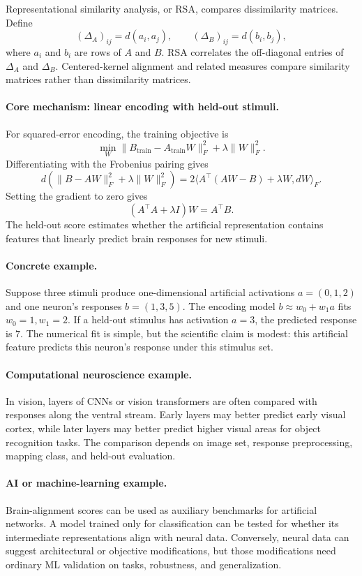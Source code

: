 Representational similarity analysis, or RSA, compares dissimilarity matrices. Define
\[
(\Delta_A)_{ij}=d(a_i,a_j),\qquad
(\Delta_B)_{ij}=d(b_i,b_j),
\]
where \(a_i\) and \(b_i\) are rows of \(A\) and \(B\). RSA correlates the off-diagonal entries of \(\Delta_A\) and \(\Delta_B\). Centered-kernel alignment and related measures compare similarity matrices rather than dissimilarity matrices.

\paragraph{Core mechanism: linear encoding with held-out stimuli.}
For squared-error encoding, the training objective is
\[
\min_W \|B_{\mathrm{train}}-A_{\mathrm{train}}W\|_F^2+\lambda\|W\|_F^2.
\]
Differentiating with the Frobenius pairing gives
\[
d\left(\|B-AW\|_F^2+\lambda\|W\|_F^2\right)
=2\langle A^\top(AW-B)+\lambda W,dW\rangle_F.
\]
Setting the gradient to zero gives
\[
(A^\top A+\lambda I)W=A^\top B.
\]
The held-out score estimates whether the artificial representation contains features that linearly predict brain responses for new stimuli.

\paragraph{Concrete example.}
Suppose three stimuli produce one-dimensional artificial activations \(a=(0,1,2)\) and one neuron's responses \(b=(1,3,5)\). The encoding model \(b\approx w_0+w_1a\) fits \(w_0=1,w_1=2\). If a held-out stimulus has activation \(a=3\), the predicted response is \(7\). The numerical fit is simple, but the scientific claim is modest: this artificial feature predicts this neuron's response under this stimulus set.

\paragraph{Computational neuroscience example.}
In vision, layers of CNNs or vision transformers are often compared with responses along the ventral stream. Early layers may better predict early visual cortex, while later layers may better predict higher visual areas for object recognition tasks. The comparison depends on image set, response preprocessing, mapping class, and held-out evaluation.

\paragraph{AI or machine-learning example.}
Brain-alignment scores can be used as auxiliary benchmarks for artificial networks. A model trained only for classification can be tested for whether its intermediate representations align with neural data. Conversely, neural data can suggest architectural or objective modifications, but those modifications need ordinary ML validation on tasks, robustness, and generalization.

